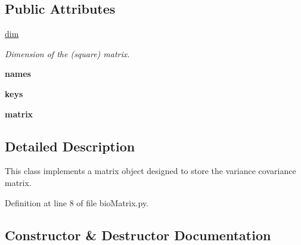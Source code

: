 \subsection*{Public Attributes}
\begin{DoxyCompactItemize}
\item 
\hyperlink{classbio_matrix_1_1bio_matrix_a3f0a9cf4ebf8b5a5caddef88d3628d19}{dim}\hypertarget{classbio_matrix_1_1bio_matrix_a3f0a9cf4ebf8b5a5caddef88d3628d19}{}\label{classbio_matrix_1_1bio_matrix_a3f0a9cf4ebf8b5a5caddef88d3628d19}

\begin{DoxyCompactList}\small\item\em Dimension of the (square) matrix. \end{DoxyCompactList}\item 
{\bfseries names}\hypertarget{classbio_matrix_1_1bio_matrix_af9f4bf1730bd2901c587018c69c12e64}{}\label{classbio_matrix_1_1bio_matrix_af9f4bf1730bd2901c587018c69c12e64}

\item 
{\bfseries keys}\hypertarget{classbio_matrix_1_1bio_matrix_ac90ed5d6e7ed7779c2566203d2d4a90e}{}\label{classbio_matrix_1_1bio_matrix_ac90ed5d6e7ed7779c2566203d2d4a90e}

\item 
{\bfseries matrix}\hypertarget{classbio_matrix_1_1bio_matrix_a8adb934516744a9ba7296921ef30eae6}{}\label{classbio_matrix_1_1bio_matrix_a8adb934516744a9ba7296921ef30eae6}

\end{DoxyCompactItemize}


\subsection{Detailed Description}
This class implements a matrix object designed to store the variance covariance matrix. 



Definition at line 8 of file bio\+Matrix.\+py.



\subsection{Constructor \& Destructor Documentation}
